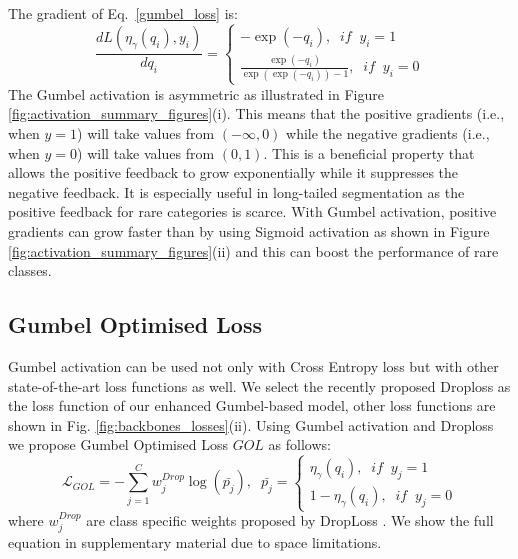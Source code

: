 \documentclass[runningheads]{llncs}
\begin{document}
\noindent The gradient of Eq.~\ref{gumbel_loss} is:
\begin{equation}
    \frac{dL(\eta_{\gamma}(q_i),y_i)}{dq_i}= 
    \begin{cases}
        -\exp(-q_i),\;\; if \;\;  y_i=1\\
        \frac{\exp(-q_i)}{\exp(\exp(-q_i))-1},\;\;  if\;\;  y_i=0
    \end{cases}
    \label{gumbel_gradient}
\end{equation}
The Gumbel activation is asymmetric as illustrated in Figure \ref{fig:activation_summary_figures}(i). This means that the positive gradients (i.e.,  when $y=1$) will take values from $(-\infty,0)$ while the negative gradients (i.e.,  when $y=0$) will take values from $(0,1)$. This is a beneficial property that allows the positive feedback to grow exponentially while it suppresses the negative feedback. It is especially useful in long-tailed segmentation as the positive feedback for rare categories is scarce. With Gumbel activation, positive gradients can grow faster than by using Sigmoid activation as shown in Figure \ref{fig:activation_summary_figures}(ii) and this can boost the performance of rare classes.

\subsection{Gumbel Optimised Loss}
Gumbel activation can be used not only with Cross Entropy loss but with other state-of-the-art loss functions as well. We select the recently proposed Droploss \cite{hsieh2021droploss} as the loss function of our enhanced Gumbel-based model, other loss functions are shown in Fig. \ref{fig:backbones_losses}(ii). Using Gumbel activation and Droploss we propose Gumbel Optimised Loss $GOL$ as follows:
\begin{equation}
    \mathcal{L}_{GOL} = -\sum_{j=1}^{C}w_j^{Drop}\log(\bar{p_j}),\;\; \bar{p_j}=\begin{cases}
         \eta_{\gamma}(q_i),\;\; if \;\;  y_j=1\\
         1-\eta_{\gamma}(q_i),\;\;  if\;\;  y_j=0
        \end{cases}
\end{equation}
where $w_j^{Drop}$ are class specific weights proposed by DropLoss \cite{hsieh2021droploss}. We show the full equation in supplementary material due to space limitations.
\end{document}
